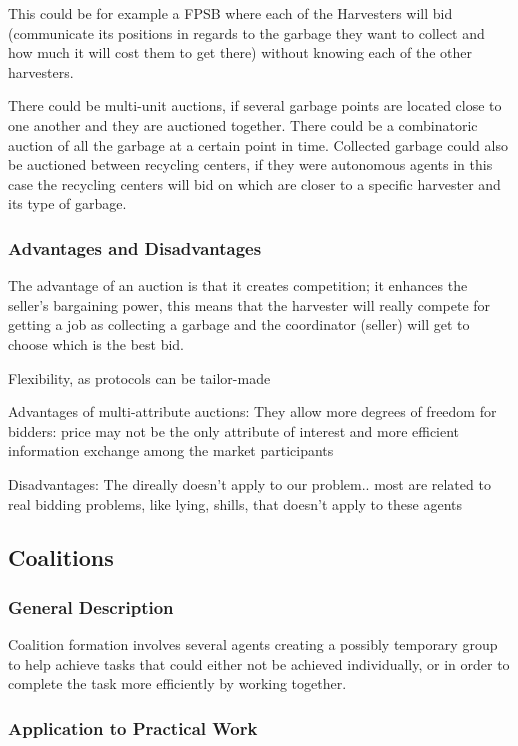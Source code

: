 This could be for example a FPSB where each of the Harvesters will bid (communicate its positions in regards to the garbage they want to  collect and how much it will cost them to get there) without knowing each of the other harvesters.

There could be multi-unit auctions, if several garbage points are located close to one another and they are auctioned together.
There could be a combinatoric auction of all the garbage at a certain point in time.
Collected garbage could also be auctioned between recycling centers, if they were autonomous agents in this case the recycling centers will bid on which are closer to a specific harvester and its type of garbage.

\subsubsection{Advantages and Disadvantages}

The advantage of an auction is that it creates competition; it enhances the seller’s bargaining power, this means that the harvester will really compete for getting a job as collecting a garbage and the coordinator (seller) will get to choose which is the best bid.

Flexibility, as protocols can be tailor-made

Advantages of multi-attribute auctions: They allow more degrees of freedom for bidders: price may not be the only attribute of interest and more efficient information exchange among the market participants

Disadvantages:
The direally doesn't apply to our problem.. most are related to real bidding problems, like lying, shills, that doesn't apply to these agents


\subsection{Coalitions}

\subsubsection{General Description}

Coalition formation involves several agents creating a possibly temporary group to help achieve tasks that could either not be achieved individually, or in order to complete the task more efficiently by working together.

\subsubsection{Application to Practical Work}

